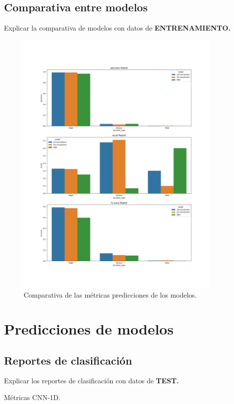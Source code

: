  \subsection{Comparativa entre modelos}

    Explicar la comparativa de modelos con datos de \textbf{ENTRENAMIENTO.}


    \begin{figure}[h]
        \centering
        \includegraphics[width=10cm]{archivos/5.Resultados/Comparativa}
        \caption{Comparativa de las métricas predicciones de los modelos.}
        \label{ResultsImage}
     \end{figure}



\section{Predicciones de modelos}

  \subsection{Reportes de clasificación}

    Explicar los reportes de clasificación con datos de \textbf{TEST.}

    \begin{table}[H]
      \centering
      \caption{Métricas CNN-1D.}
      \label{CNN1DMetrics}
    \end{table}

